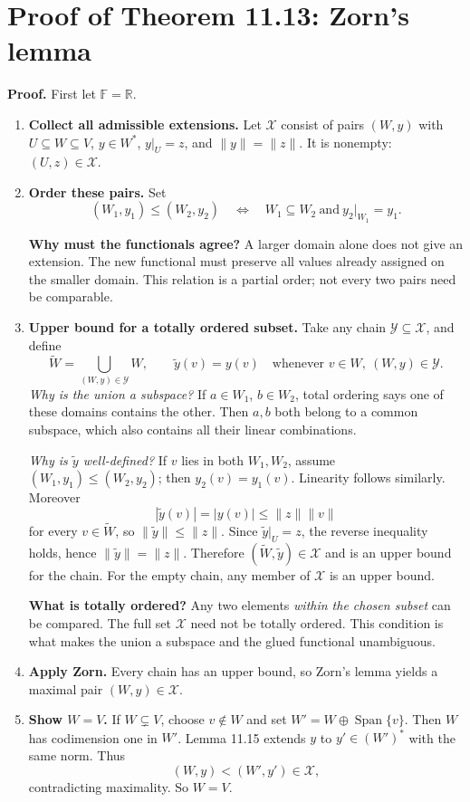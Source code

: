 \documentclass[11pt,a4paper]{article}
\newcommand{\F}{\mathbb F}
\newenvironment{proofsteps}{\begin{enumerate}\setlength{\itemsep}{4pt}}{\end{enumerate}}
\begin{document}
\section{Proof of Theorem 11.13: Zorn's lemma}
\textbf{Proof.} First let \(\F=\mathbb R\).
\begin{proofsteps}
\item \textbf{Collect all admissible extensions.} Let \(\mathcal X\) consist of pairs \((W,y)\) with \(U\subseteq W\subseteq V\), \(y\in W^*\), \(y|_U=z\), and \(\|y\|=\|z\|\).
It is nonempty: \((U,z)\in\mathcal X\).

\item \textbf{Order these pairs.} Set
\[
 (W_1,y_1)\leq(W_2,y_2)
 \quad\Longleftrightarrow\quad
 W_1\subseteq W_2\ \text{and}\ y_2|_{W_1}=y_1.
\]
\begin{personalnote}
\textbf{Why must the functionals agree?} A larger domain alone does not give an extension. The new functional must preserve all values already assigned on the smaller domain. This relation is a partial order; not every two pairs need be comparable.
\end{personalnote}

\item \textbf{Upper bound for a totally ordered subset.} Take any chain \(\mathcal Y\subseteq\mathcal X\), and define
\[
 \widetilde W=\bigcup_{(W,y)\in\mathcal Y}W,\qquad
 \widetilde y(v)=y(v)\quad\text{whenever }v\in W,\ (W,y)\in\mathcal Y.
\]
\emph{Why is the union a subspace?} If \(a\in W_1\), \(b\in W_2\), total ordering says one of these domains contains the other. Then \(a,b\) both belong to a common subspace, which also contains all their linear combinations.

\emph{Why is \(\widetilde y\) well-defined?} If \(v\) lies in both \(W_1,W_2\), assume \((W_1,y_1)\leq(W_2,y_2)\); then \(y_2(v)=y_1(v)\). Linearity follows similarly. Moreover
\[
 |\widetilde y(v)|=|y(v)|\leq\|z\|\|v\|
\]
for every \(v\in\widetilde W\), so \(\|\widetilde y\|\leq\|z\|\).
Since \(\widetilde y|_U=z\), the reverse inequality holds, hence \(\|\widetilde y\|=\|z\|\).
Therefore \((\widetilde W,\widetilde y)\in\mathcal X\) and is an upper bound for the chain. For the empty chain, any member of \(\mathcal X\) is an upper bound.
\begin{personalnote}
\textbf{What is totally ordered?} Any two elements \emph{within the chosen subset} can be compared. The full set \(\mathcal X\) need not be totally ordered. This condition is what makes the union a subspace and the glued functional unambiguous.
\end{personalnote}

\item \textbf{Apply Zorn.} Every chain has an upper bound, so Zorn's lemma yields a maximal pair \((W,y)\in\mathcal X\).

\item \textbf{Show \(W=V\).} If \(W\subsetneq V\), choose \(v\notin W\) and set \(W'=W\oplus\operatorname{Span}\{v\}\). Then \(W\) has codimension one in \(W'\). Lemma 11.15 extends \(y\) to \(y'\in(W')^*\) with the same norm. Thus
\[
 (W,y)<(W',y')\in\mathcal X,
\]
contradicting maximality. So \(W=V\).
\end{proofsteps}
\end{document}
